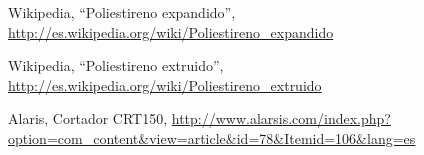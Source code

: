 	Wikipedia,
	“Poliestireno expandido”,
	\scriptsize \url{http://es.wikipedia.org/wiki/Poliestireno_expandido} \normalsize

	Wikipedia,
	“Poliestireno extruido”,
	\scriptsize \url{http://es.wikipedia.org/wiki/Poliestireno_extruido} \normalsize

	Alaris,
	Cortador CRT150,
	\scriptsize \url{http://www.alarsis.com/index.php?option=com_content&view=article&id=78&Itemid=106&lang=es} \normalsize

